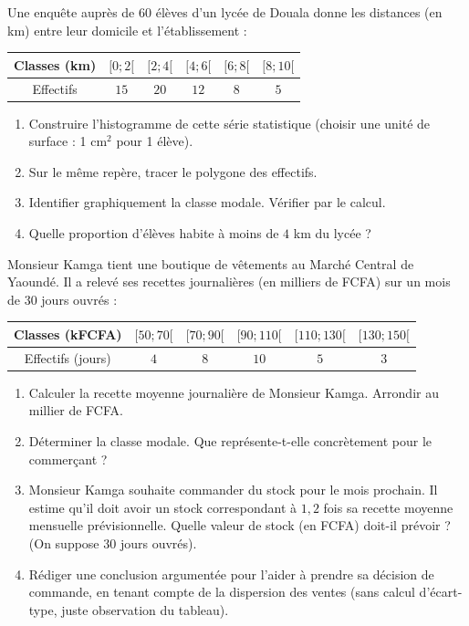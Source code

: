 \documentclass[11pt]{article}
\newcounter{popsec}
\newcounter{popsub}
\newcommand{\courssub}[1]{%
  \stepcounter{popsub}%
  \par\vspace{9pt}\noindent{\popxbold\fontsize{11.5}{13}\selectfont\color{popink}{\color{poporange}\thepopsec.\thepopsub}\hspace{6pt}#1}\par\nopagebreak\vspace{4pt}
}
\begin{document}
\begin{exercice}
Une enquête auprès de $60$ élèves d'un lycée de Douala donne les distances (en km) entre leur domicile et l'établissement :
\begin{center}
\begin{tabular}{|c|c|c|c|c|c|}\hline
Classes (km) & $[0 ; 2[$ & $[2 ; 4[$ & $[4 ; 6[$ & $[6 ; 8[$ & $[8 ; 10[$ \\ \hline
Effectifs & $15$ & $20$ & $12$ & $8$ & $5$ \\ \hline
\end{tabular}
\end{center}
\begin{enumerate}
    \item Construire l'histogramme de cette série statistique (choisir une unité de surface : 1 cm$^2$ pour 1 élève).
    \item Sur le même repère, tracer le polygone des effectifs.
    \item Identifier graphiquement la classe modale. Vérifier par le calcul.
    \item Quelle proportion d'élèves habite à moins de $4$ km du lycée ?
\end{enumerate}
\end{exercice}

\courssub{Je me prépare au Probatoire}

\begin{exercice}
Monsieur Kamga tient une boutique de vêtements au Marché Central de Yaoundé. Il a relevé ses recettes journalières (en milliers de FCFA) sur un mois de $30$ jours ouvrés :
\begin{center}
\begin{tabular}{|c|c|c|c|c|c|}\hline
Classes (kFCFA) & $[50 ; 70[$ & $[70 ; 90[$ & $[90 ; 110[$ & $[110 ; 130[$ & $[130 ; 150[$ \\ \hline
Effectifs (jours) & $4$ & $8$ & $10$ & $5$ & $3$ \\ \hline
\end{tabular}
\end{center}
\begin{enumerate}
    \item Calculer la recette moyenne journalière de Monsieur Kamga. Arrondir au millier de FCFA.
    \item Déterminer la classe modale. Que représente-t-elle concrètement pour le commerçant ?
    \item Monsieur Kamga souhaite commander du stock pour le mois prochain. Il estime qu'il doit avoir un stock correspondant à $1,2$ fois sa recette moyenne mensuelle prévisionnelle. Quelle valeur de stock (en FCFA) doit-il prévoir ? (On suppose $30$ jours ouvrés).
    \item Rédiger une conclusion argumentée pour l'aider à prendre sa décision de commande, en tenant compte de la dispersion des ventes (sans calcul d'écart-type, juste observation du tableau).
\end{enumerate}
\end{exercice}
\end{document}
